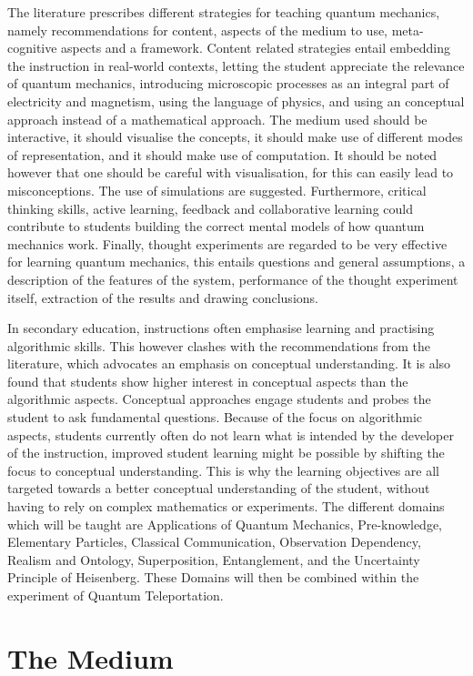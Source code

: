 \documentclass[11pt,twoside]{report} %
\begin{document}
The literature prescribes different strategies for teaching quantum mechanics, namely recommendations for content, aspects of the medium to use, meta-cognitive aspects and a framework. Content related strategies entail embedding the instruction in real-world contexts, letting the student appreciate the relevance of quantum mechanics, introducing microscopic processes as an integral part of electricity and magnetism, using the language of physics, and using an conceptual approach instead of a mathematical approach. The medium used should be interactive, it should visualise the concepts, it should make use of different modes of representation, and it should make use of computation. It should be noted however that one should be careful with visualisation, for this can easily lead to misconceptions. The use of simulations are suggested. Furthermore, critical thinking skills, active learning, feedback and collaborative learning could contribute to students building the correct mental models of how quantum mechanics work. Finally, thought experiments are regarded to be very effective for learning quantum mechanics, this entails questions and general assumptions, a description of the features of the system, performance of the thought experiment itself, extraction of the results and drawing conclusions.

In secondary education, instructions often emphasise learning and practising algorithmic skills. This however clashes with the recommendations from the literature, which advocates an emphasis on conceptual understanding. It is also found that students show higher interest in conceptual aspects than the algorithmic aspects. Conceptual approaches engage students and probes the student to ask fundamental questions. Because of the focus on algorithmic aspects, students currently often do not learn what is intended by the developer of the instruction, improved student learning might be possible by shifting the focus to conceptual understanding. This is why the learning objectives are all targeted towards a better conceptual understanding of the student, without having to rely on complex mathematics or experiments. The different domains which will be taught are Applications of Quantum Mechanics, Pre-knowledge, Elementary Particles, Classical Communication, Observation Dependency, Realism and Ontology, Superposition, Entanglement, and the Uncertainty Principle of Heisenberg. These Domains will then be combined within the experiment of Quantum Teleportation.

\section{The Medium}
\end{document}
